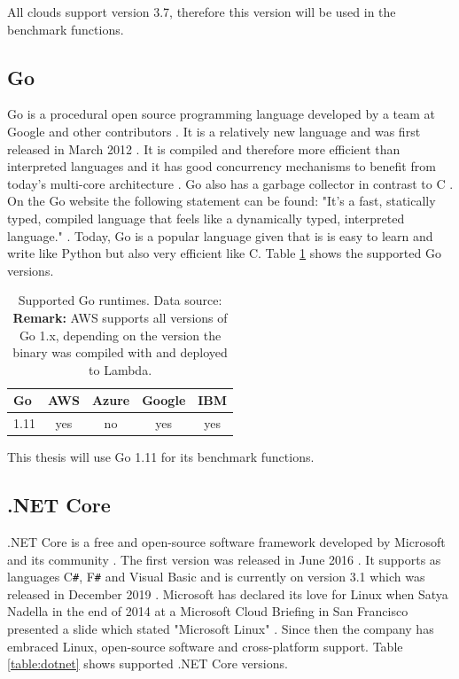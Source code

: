 All clouds support version 3.7, therefore this version will be used in the benchmark functions.

\subsection{Go}
Go is a procedural open source programming language developed by a team at Google and other contributors \cite{GoDoc, GoProject}. It is a relatively new language and was first released in March 2012 \cite{GoProject}. It is compiled and therefore more efficient than interpreted languages and it has good concurrency mechanisms to benefit from today's multi-core architecture \cite{GoDoc}. Go also has a garbage collector in contrast to C \cite{GoDoc}. On the Go website the following statement can be found: "It's a fast, statically typed, compiled language that feels like a dynamically typed, interpreted language." \cite{GoDoc}. Today, Go is a popular language given that is is easy to learn and write like Python but also very efficient like C. Table \ref{table:go} shows the supported Go versions.

\begin{table}[htp]
\centering
\captionsetup[table]{justification=centering, labelfont=bf}
\begin{tabular}{|l|c|c|c|c|} 
 \hline
 Go & AWS & Azure & Google & IBM \\ \hline
1.11  & \cellcolor{green!25}yes    & \cellcolor{red!25}no    & \cellcolor{green!25}yes  & \cellcolor{green!25}yes\\ \hline
\end{tabular}
\caption[Supported Go runtimes]{Supported Go runtimes. Data source: \cite{AWSLambdaLanguages, AzureFunctionsLanguages, GoogleFunctionsLanguages, IBMRuntimes}\\ \textbf{Remark:} AWS supports all versions of Go 1.x, depending on the version the binary was compiled with and deployed to Lambda.}
\label{table:go}
\end{table}

This thesis will use Go 1.11 for its benchmark functions.
\subsection{.NET Core}

.NET Core is a free and open-source software framework developed by Microsoft and its community \cite{.NETCore}. The first version was released in June 2016 \cite{.NETCoreReleases}. It supports as languages C\texttt{\#}, F\texttt{\#} and Visual Basic \cite{.NETAbout} and is currently on version 3.1 which was released in December 2019 \cite{.NETCoreBlog}. Microsoft has declared its love for Linux when Satya Nadella in the end of 2014 at a Microsoft Cloud Briefing in San Francisco presented a slide which stated "Microsoft \heart \text{ }Linux" \cite{MicrosoftCloudBlog}. Since then the company has embraced Linux, open-source software and cross-platform support. Table \ref{table:dotnet} shows supported .NET Core versions.

